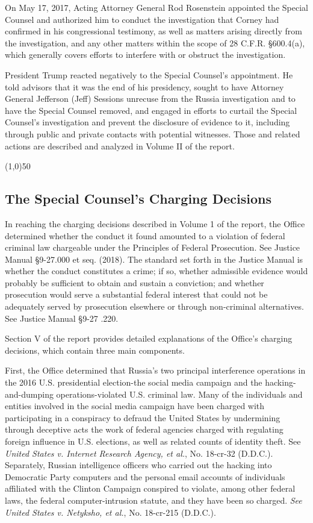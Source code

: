 \documentclass{article}
\newcommand{\hr}{\begin{center} \line(1,0){50} \end{center}}
\begin{document}
On May 17, 2017, Acting Attorney General Rod Rosenstein appointed the Special Counsel and authorized him to conduct the investigation that Corney had confirmed in his congressional testimony, as well as matters arising directly from the investigation, and any other matters within the scope of 28 C.F.R. \S 600.4(a), which generally covers efforts to interfere with or obstruct the investigation.

President Trump reacted negatively to the Special Counsel's appointment.
He told advisors that it was the end of his presidency, sought to have Attorney General Jefferson (Jeff) Sessions unrecuse from the Russia investigation and to have the Special Counsel removed, and engaged in efforts to curtail the Special Counsel's investigation and prevent the disclosure of evidence to it, including through public and private contacts with potential witnesses.
Those and related actions are described and analyzed in Volume II of the report.

\hr

\subsection{The Special Counsel's Charging Decisions}

In reaching the charging decisions described in Volume 1 of the report, the Office determined whether the conduct it found amounted to a violation of federal criminal law chargeable under the Principles of Federal Prosecution.
See Justice Manual \S 9-27.000 et seq. (2018).
The standard set forth in the Justice Manual is whether the conduct constitutes a crime; if so, whether admissible evidence would probably be sufficient to obtain and sustain a conviction; and whether prosecution would serve a substantial federal interest that could not be adequately served by prosecution elsewhere or through non-criminal alternatives.
See Justice Manual \S 9-27 .220.

Section V of the report provides detailed explanations of the Office's charging decisions, which contain three main components.

First, the Office determined that Russia's two principal interference operations in the 2016 U.S. presidential election-the social media campaign and the hacking-and-dumping operations-violated U.S. criminal law.
Many of the individuals and entities involved in the social media campaign have been charged with participating in a conspiracy to defraud the United States by undermining through deceptive acts the work of federal agencies charged with regulating foreign influence in U.S. elections, as well as related counts of identity theft. See \textit{United States v. Internet Research Agency, et al.}, No. 18-cr-32 (D.D.C.).
Separately, Russian intelligence officers who carried out the hacking into Democratic Party computers and the personal email accounts of individuals affiliated with the Clinton Campaign conspired to violate, among other federal laws, the federal computer-intrusion statute, and they have been so charged.
\textit{See United States v. Netyksho, et al.}, No. 18-cr-215 (D.D.C.).
\end{document}
